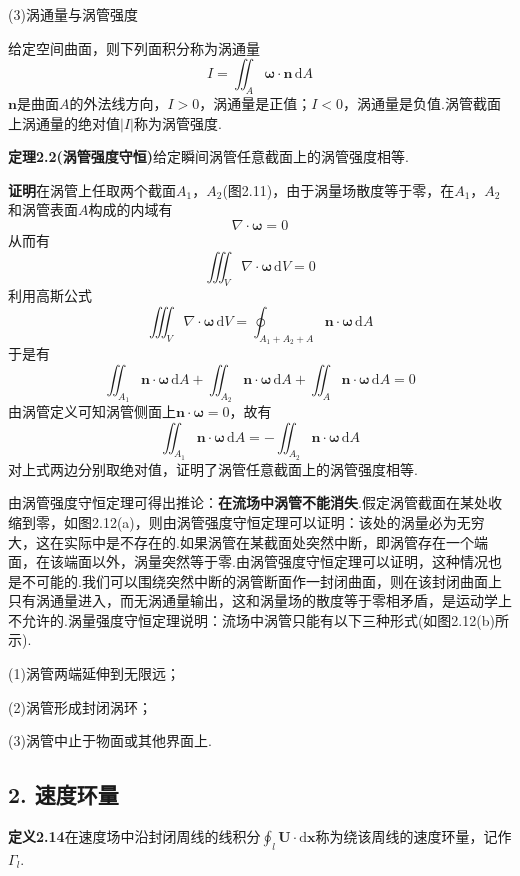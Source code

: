 (3)涡通量与涡管强度

给定空间曲面，则下列面积分称为涡通量
\begin{equation*}
I=\iint_A \boldsymbol{\omega}\cdot\boldsymbol{n}\,\mathrm{d}A
\tag{2.42}
\end{equation*}
$\boldsymbol{n}$是曲面$A$的外法线方向，$I>0$，涡通量是正值；$I<0$，涡通量是负值.涡管截面上涡通量的绝对值$|I|$称为涡管强度.

\noindent\textbf{定理2.2(涡管强度守恒)}\quad 给定瞬间涡管任意截面上的涡管强度相等.

\noindent\textbf{证明}\quad 在涡管上任取两个截面$A_1$，$A_2$(图2.11)，由于涡量场散度等于零，在$A_1$，$A_2$和涡管表面$A$构成的内域有
\[
\nabla\cdot\boldsymbol{\omega}=0
\]
从而有
\[
\iiint_V \nabla\cdot\boldsymbol{\omega}\,\mathrm{d}V=0
\]
利用高斯公式
\[
\iiint_V \nabla\cdot\boldsymbol{\omega}\,\mathrm{d}V=\oint_{A_1+A_2+A} \boldsymbol{n}\cdot\boldsymbol{\omega}\,\mathrm{d}A
\]
于是有
\[
\iint_{A_1}\boldsymbol{n}\cdot\boldsymbol{\omega}\,\mathrm{d}A+\iint_{A_2}\boldsymbol{n}\cdot\boldsymbol{\omega}\,\mathrm{d}A+\iint_{A}\boldsymbol{n}\cdot\boldsymbol{\omega}\,\mathrm{d}A=0
\]
由涡管定义可知涡管侧面上$\boldsymbol{n}\cdot\boldsymbol{\omega}=0$，故有
\[
\iint_{A_1}\boldsymbol{n}\cdot\boldsymbol{\omega}\,\mathrm{d}A=-\iint_{A_2}\boldsymbol{n}\cdot\boldsymbol{\omega}\,\mathrm{d}A
\]
对上式两边分别取绝对值，证明了涡管任意截面上的涡管强度相等.

由涡管强度守恒定理可得出推论：\textbf{在流场中涡管不能消失}.假定涡管截面在某处收缩到零，如图2.12(a)，则由涡管强度守恒定理可以证明：该处的涡量必为无穷大，这在实际中是不存在的.如果涡管在某截面处突然中断，即涡管存在一个端面，在该端面以外，涡量突然等于零.由涡管强度守恒定理可以证明，这种情况也是不可能的.我们可以围绕突然中断的涡管断面作一封闭曲面，则在该封闭曲面上只有涡通量进入，而无涡通量输出，这和涡量场的散度等于零相矛盾，是运动学上不允许的.涡量强度守恒定理说明：流场中涡管只能有以下三种形式(如图2.12(b)所示).

(1)涡管两端延伸到无限远；

(2)涡管形成封闭涡环；

(3)涡管中止于物面或其他界面上.

\subsection*{2. 速度环量}

\noindent\textbf{定义2.14}\quad 在速度场中沿封闭周线的线积分$\displaystyle\oint_l\boldsymbol{U}\cdot\mathrm{d}\boldsymbol{x}$称为绕该周线的速度环量，记作$\Gamma_l$.

